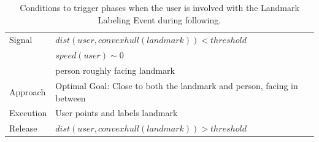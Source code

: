 \begin{table}[ht!]
	\centering
  \begin{tabular}{l |  m{10cm}}    
    \toprule    
    Signal & {$dist(user, convex hull(landmark))<threshold$}\\       
	                           & {$speed(user)\sim 0$} \\
	                           & {person roughly facing landmark}\\ \midrule		                           		                                
    Approach & {Optimal Goal: Close to both the landmark and person, facing in between}\\       \midrule
    Execution & {User points and labels landmark}\\  \midrule
    Release & {$dist(user, convex hull(landmark))>threshold$}\\ 
    \bottomrule
  \end{tabular}
      \caption{Conditions to trigger phases when the user is involved with the Landmark Labeling Event during following.}
    \label{table:situation_aware_list_landmark}
\end{table}


